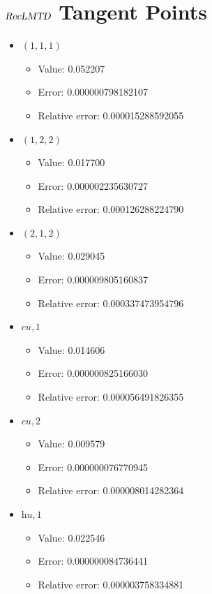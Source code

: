 \documentclass{article}%
\begin{document}
\section{$\textsl{RecLMTD}$ Tangent Points}%
\thispagestyle{plain}%
\begin{itemize}%
	\item $(1, 1, 1)$%
	\begin{itemize}%
		\item Value: 0.052207%
		\item Error: 0.000000798182107%
		\item Relative error: 0.000015288592055%
	\end{itemize}%
	\item $(1, 2, 2)$%
	\begin{itemize}%
		\item Value: 0.017700%
		\item Error: 0.000002235630727%
		\item Relative error: 0.000126288224790%
	\end{itemize}%
	\item $(2, 1, 2)$%
	\begin{itemize}%
		\item Value: 0.029045%
		\item Error: 0.000009805160837%
		\item Relative error: 0.000337473954796%
	\end{itemize}%
	\item $\textit{cu},1$%
	\begin{itemize}%
		\item Value: 0.014606%
		\item Error: 0.000000825166030%
		\item Relative error: 0.000056491826355%
	\end{itemize}%
	\item $\textit{cu},2$%
	\begin{itemize}%
		\item Value: 0.009579%
		\item Error: 0.000000076770945%
		\item Relative error: 0.000008014282364%
	\end{itemize}%
	\item $\textit{hu},1$%
	\begin{itemize}%
		\item Value: 0.022546%
		\item Error: 0.000000084736441%
		\item Relative error: 0.000003758334881%
	\end{itemize}%
\end{itemize}%
\end{document}
